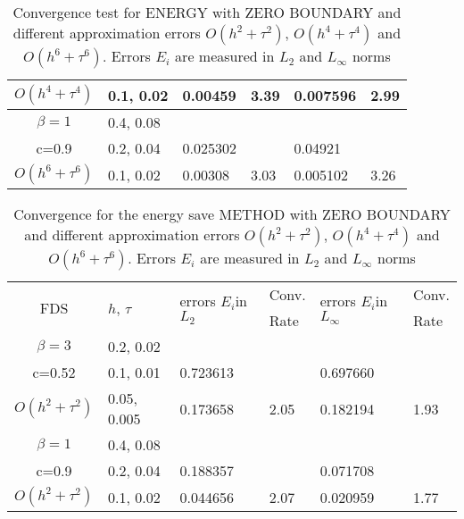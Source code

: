 \documentclass{article}
\begin{document}
\begin{table}[ht]
\begin{tabular}{||c|l|ll|ll||}
       $O(h^4+ \tau^4)$ &0.1, 0.02   & 0.00459& 3.39    &0.007596  & 2.99  \\
    \hline
  $\beta=1$     &0.4, 0.08   &                      &           &                   &      \\
      c=0.9    &0.2, 0.04        & 0.025302     &           & 0.04921     &       \\
     $O(h^6+ \tau^6)$         &  0.1, 0.02    & 0.00308 & 3.03  &0.005102 & 3.26        \\
	   \hline
			\hline 
		\end{tabular}
		\caption{Convergence test for ENERGY with ZERO BOUNDARY and different approximation errors $O(h^{2} + \tau^2 )$, $O(h^{4} + \tau^4 )$ and $O(h^{6} + \tau^6 )$. Errors $E_i$ are measured in $L_2$ and $L_\infty$ norms}
\label{tableB}
\end{table}

\begin{table}[ht]
\centering
\small
		\begin{tabular}{||c|l|ll|ll||}
			\hline
			\hline
      \multirow{2  }{*}{FDS}        & \multirow{2  }{*}{$h$, $\tau$}  & \multirow{2  }{*}{errors $E_i$in$L_2$}  &Conv.& \multirow{2  }{*}{errors $E_i$in$L_\infty$}  &Conv.  \\
	                                        &                                                     &                                                                 &  Rate &                                                                       & Rate \\
   			\hline 
					\hline 
  $\beta=3$                &0.2, 0.02         &                    &                &                  &                   \\
   c=0.52                     &0.1, 0.01         & 0.723613   &                & 0.697660  &                   \\
     $O(h^2 + \tau^ 2)$ &0.05, 0.005  & 0.173658   & 2.05       & 0.182194   & 1.93    \\
	   \hline
			\hline 
       $\beta=1$           & 0.4, 0.08       &                   &           &                 &   \\
                  c=0.9       & 0.2, 0.04        & 0.188357   &          &0.071708  &   \\
  $O(h^2+ \tau^2)$  & 0.1, 0.02       & 0.044656   & 2.07  &0.020959  & 1.77 \\
	   \hline
			\hline 
		\end{tabular}
		\caption{ Convergence for the energy save METHOD with ZERO BOUNDARY and different approximation errors $O(h^{2} + \tau^2 )$, $O(h^{4} + \tau^4 )$ and $O(h^{6} + \tau^6 )$. Errors $E_i$ are measured in $L_2$ and $L_\infty$ norms}
\label{tableB}
\end{table}
\end{document}
